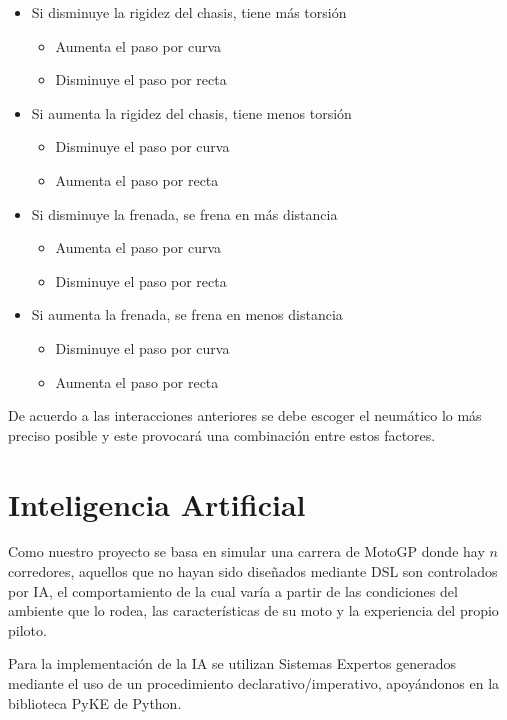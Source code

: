 \documentclass[12pt, letterpaper,spanish]{article}
\theoremstyle{definition}
\theoremstyle{remark}
\begin{document}
\begin{itemize}
		\item Si disminuye la rigidez del chasis, tiene más torsión
		\begin{itemize}
			\item Aumenta el paso por curva
			\item Disminuye el paso por recta
		\end{itemize}
		\item Si aumenta la rigidez del chasis, tiene menos torsión
		\begin{itemize}
			\item Disminuye el paso por curva
			\item Aumenta el paso por recta
		\end{itemize}
		
		\item Si disminuye la frenada, se frena en más distancia
		\begin{itemize}
			\item Aumenta el paso por curva
			\item Disminuye el paso por recta
		\end{itemize}
		\item Si aumenta la frenada, se frena en menos distancia
		\begin{itemize}
			\item Disminuye el paso por curva
			\item Aumenta el paso por recta
		\end{itemize}
	\end{itemize}
	De acuerdo a las interacciones anteriores se debe escoger el neumático lo más preciso posible y este provocará una combinación entre estos factores.

\section{Inteligencia Artificial}\cite{conferenciasIA}\cite{russell}
	Como nuestro proyecto se basa en simular una carrera de MotoGP donde hay $n$ corredores, aquellos que no hayan sido diseñados mediante DSL son controlados por IA, el comportamiento de la cual varía a partir de las condiciones del ambiente que lo rodea, las características de su moto y la experiencia del propio piloto.
	
	Para la implementación de la IA se utilizan Sistemas Expertos generados mediante el uso de un procedimiento declarativo/imperativo, apoyándonos en la biblioteca PyKE\cite{pyke} de Python.
	
\end{document}
